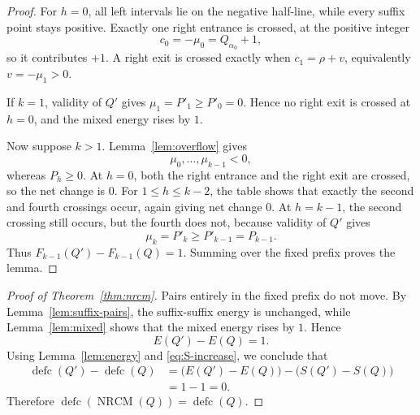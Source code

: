 \documentclass[10pt]{article}
\newcommand{\defc}{\operatorname{defc}}
\newcommand{\NRCM}{\operatorname{NRCM}}
\begin{document}
\begin{proof}
For \(h=0\), all left intervals lie on the negative half-line, while every
suffix point stays positive.  Exactly one right entrance is crossed, at the
positive integer
\[
  c_0=-\mu_0=Q_{\alpha_0}+1,
\]
so it contributes \(+1\).  A right exit is crossed exactly when
\(c_1=\rho+v\), equivalently \(v=-\mu_1>0\).

If \(k=1\), validity of \(Q'\) gives
\(\mu_1=P'_1\ge P'_0=0\).  Hence no right exit is crossed at \(h=0\), and
the mixed energy rises by \(1\).

Now suppose \(k>1\).  Lemma~\ref{lem:overflow} gives
\[
  \mu_0,\ldots,\mu_{k-1}<0,
\]
whereas \(P_h\ge0\).  At \(h=0\), both the right entrance and the right exit
are crossed, so the net change is \(0\).  For
\(1\le h\le k-2\), the table shows that exactly the second and fourth
crossings occur, again giving net change \(0\).  At \(h=k-1\), the second
crossing still occurs, but the fourth does not, because validity of \(Q'\)
gives
\[
  \mu_k=P'_k\ge P'_{k-1}=P_{k-1}.
\]
Thus \(F_{k-1}(Q')-F_{k-1}(Q)=1\).  Summing over the fixed prefix proves the
lemma.
\end{proof}

\begin{proof}[Proof of Theorem~\ref{thm:nrcm}]
Pairs entirely in the fixed prefix do not move.  By
Lemma~\ref{lem:suffix-pairs}, the suffix-suffix energy is unchanged, while
Lemma~\ref{lem:mixed} shows that the mixed energy rises by \(1\).  Hence
\[
  E(Q')-E(Q)=1.
\]
Using Lemma~\ref{lem:energy} and \eqref{eq:S-increase}, we conclude that
\[
\begin{aligned}
\defc(Q')-\defc(Q)
&=\bigl(E(Q')-E(Q)\bigr)-\bigl(S(Q')-S(Q)\bigr)\\
&=1-1=0.
\end{aligned}
\]
Therefore \(\defc(\NRCM(Q))=\defc(Q)\).
\end{proof}
\end{document}

